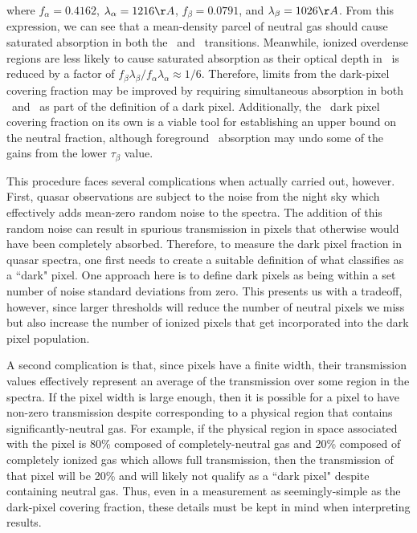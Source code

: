 where $f_{\alpha} = 0.4162$, $\lambda_{\alpha} = 1216 \AA$, $f_{\beta} = 0.0791$, and $\lambda_{\beta} = 1026\AA$. From this expression, we can see that a mean-density parcel of neutral gas should cause saturated absorption in both the \lya\ and \lyb\ transitions. Meanwhile, ionized overdense regions are less likely to cause saturated absorption as their optical depth in \lyb\ is reduced by a factor of $f_{\beta}\lambda_{\beta}/f_{\alpha}\lambda_{\alpha} \approx 1/6$. Therefore, limits from the dark-pixel covering fraction may be improved by requiring simultaneous absorption in both \lya\ and \lyb\ as part of the definition of a dark pixel. Additionally, the \lyb\ dark pixel covering fraction on its own is a viable tool for establishing an upper bound on the neutral fraction, although foreground \lya\ absorption may undo some of the gains from the lower $\tau_{\beta}$ value.

This procedure faces several complications when actually carried out, however. First, quasar observations are subject to the noise from the night sky which effectively adds mean-zero random noise to the spectra. The addition of this random noise can result in spurious transmission in pixels that otherwise would have been completely absorbed. Therefore, to measure the dark pixel fraction in quasar spectra, one first needs to create a suitable definition of what classifies as a ``dark" pixel. One approach here is to define dark pixels as being within a set number of noise standard deviations from zero. This presents us with a tradeoff, however, since larger thresholds will reduce the number of neutral pixels we miss but also increase the number of ionized pixels that get incorporated into the dark pixel population.

A second complication is that, since pixels have a finite width, their transmission values effectively represent an average of the transmission over some region in the spectra. If the pixel width is large enough, then it is possible for a pixel to have non-zero transmission despite corresponding to a physical region that contains significantly-neutral gas. For example, if the physical region in space associated with the pixel is 80\% composed of completely-neutral gas and 20\% composed of completely ionized gas which allows full transmission, then the transmission of that pixel will be 20\% and will likely not qualify as a ``dark pixel" despite containing neutral gas. Thus, even in a measurement as seemingly-simple as the dark-pixel covering fraction, these details must be kept in mind when interpreting results.

